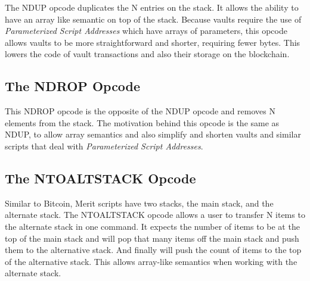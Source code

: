 \documentclass{article}
\begin{document}
The NDUP opcode duplicates the N entries on the stack. It allows the ability to 
have an array like semantic on top of the stack. Because vaults require the use of
\emph{Parameterized Script Addresses} which have arrays of parameters, this opcode
allows vaults to be more straightforward and shorter, requiring fewer bytes.
This lowers the code of vault transactions and also their storage on the
blockchain.

\subsection{The NDROP Opcode}

\begin{center}
\end{center}

This NDROP opcode is the opposite of the NDUP opcode and removes N elements from the stack.
The motivation behind this opcode is the same as NDUP, to allow array semantics and
also simplify and shorten vaults and similar scripts that deal with
\emph{Parameterized Script Addresses}.

\subsection{The NTOALTSTACK Opcode}

\begin{center}
\end{center}

Similar to Bitcoin, Merit scripts have two stacks, the main stack, and the alternate
stack. The NTOALTSTACK opcode allows a user to transfer N items to the alternate stack
in one command. It expects the number of items to be at the top of the main stack and
will pop that many items off the main stack and push them to the alternative stack. And
finally will push the count of items to the top of the alternative stack. This allows 
array-like semantics when working with the alternate stack.
\end{document}
